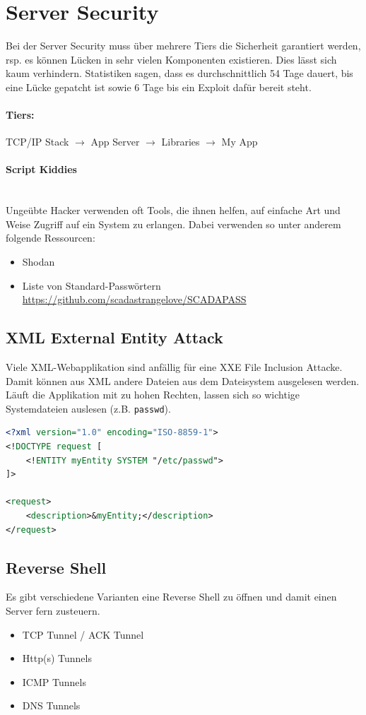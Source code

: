 \section{Server Security}
Bei der Server Security muss über mehrere Tiers die Sicherheit garantiert werden, rsp. es können Lücken in sehr vielen Komponenten existieren. Dies lässt sich kaum verhindern.
Statistiken sagen, dass es durchschnittlich 54 Tage dauert, bis eine Lücke gepatcht ist sowie 6 Tage bis ein Exploit dafür bereit steht.

\paragraph{Tiers: } TCP/IP Stack $\rightarrow$ App Server $\rightarrow$ Libraries $\rightarrow$ My App 

\paragraph{Script Kiddies} \hfill \\
Ungeübte Hacker verwenden oft Tools, die ihnen helfen, auf einfache Art und Weise Zugriff auf ein System zu erlangen. Dabei verwenden so unter anderem folgende Ressourcen:
\begin{itemize}
	\item Shodan
	\item Liste von Standard-Passwörtern \url{https://github.com/scadastrangelove/SCADAPASS}
\end{itemize}

\subsection{XML External Entity Attack}
Viele XML-Webapplikation sind anfällig für eine XXE File Inclusion Attacke. Damit können aus XML andere Dateien aus dem Dateisystem ausgelesen werden. Läuft die Applikation mit zu hohen Rechten, lassen sich so wichtige Systemdateien auslesen (z.B. \lstinline|passwd|).

\begin{lstlisting}[language=XML]
<?xml version="1.0" encoding="ISO-8859-1">
<!DOCTYPE request [
	<!ENTITY myEntity SYSTEM "/etc/passwd">
]>

<request>
	<description>&myEntity;</description>
</request>
\end{lstlisting}

\subsection{Reverse Shell}
Es gibt verschiedene Varianten eine Reverse Shell zu öffnen und damit einen Server fern zusteuern.
\begin{itemize}
	\item TCP Tunnel / ACK Tunnel
	\item Http(s) Tunnels
	\item ICMP Tunnels
	\item DNS Tunnels
\end{itemize}

